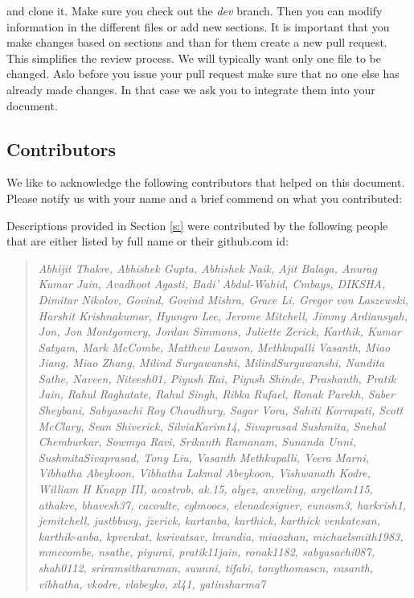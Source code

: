 \begin{enumerate}

and clone it. Make sure you check out the {\em dev} branch. Then you
can modify information in the different files or add new sections. It
is important that you make changes based on sections and than for them
create a new pull request. This simplifies the review process. We will
typically want only one file to be changed. Aslo before you issue your
pull request make sure that no one else has already made changes. In
that case we ask you to integrate them into your document.


\subsection{Contributors}

We like to acknowledge the following contributors that helped on this
document. Please notify us with your name and a brief commend on what
you contributed:

Descriptions provided in Section \ref{s:} were contributed by the
following people that are either listed by full name or their
github.com id:

\begin{quotation}{\em
Abhijit Thakre, Abhishek Gupta, Abhishek Naik, Ajit Balaga, Anurag
Kumar Jain, Avadhoot Agasti, Badi' Abdul-Wahid, Cmbays, DIKSHA,
Dimitar Nikolov, Govind, Govind Mishra, Grace Li, Gregor von
Laszewski, Harshit Krishnakumar, Hyungro Lee, Jerome Mitchell, Jimmy
Ardiansyah, Jon, Jon Montgomery, Jordan Simmons, Juliette Zerick,
Karthik, Kumar Satyam, Mark McCombe, Matthew Lawson, Methkupalli
Vasanth, Miao Jiang, Miao Zhang, Milind Suryawanshi,
MilindSuryawanshi, Nandita Sathe, Naveen, Niteesh01, Piyush Rai,
Piyush Shinde, Prashanth, Pratik Jain, Rahul Raghatate, Rahul Singh,
Ribka Rufael, Ronak Parekh, Saber Sheybani, Sabyasachi Roy Choudhury,
Sagar Vora, Sahiti Korrapati, Scott McClary, Sean Shiverick,
SilviaKarim14, Sivaprasad Sushmita, Snehal Chemburkar, Sowmya Ravi,
Srikanth Ramanam, Sunanda Unni, SushmitaSivaprasad, Tony Liu, Vasanth
Methkupalli, Veera Marni, Vibhatha Abeykoon, Vibhatha Lakmal Abeykoon,
Vishwanath Kodre, William H Knapp III, acastrob, ak.15, alyez,
anveling, argetlam115, athakre, bhavesh37, cacoulte, cglmoocs,
elenadesigner, eunosm3, harkrish1, jemitchell, justbbusy, jzerick,
kartanba, karthick, karthick venkatesan, karthik-anba, kpvenkat,
ksrivatsav, lmundia, miaozhan, michaelsmith1983, mmccombe, nsathe,
piyurai, pratik11jain, ronak1182, sabyasachi087,
shah0112, sriramsitharaman, suunni, tifabi, tonythomascn, vasanth,
vibhatha, vkodre, vlabeyko, xl41, yatinsharma7
}\end{quotation}



\end{enumerate}
